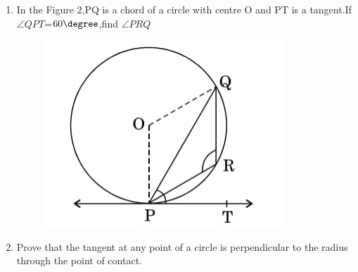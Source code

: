 \begin{enumerate}
 \item In the Figure $2$,PQ is a chord of a circle with centre O and PT is a tangent.If $\angle QPT$=$60\degree$,find $\angle PRQ$
  \begin{figure}[h]
      \centering
      \includegraphics[width=0.6\columnwidth]{figs/cir12.jpg}
  \end{figure}

  \item Prove that the tangent at any point of a circle is perpendicular to the radius through the point of
  contact.


\end{enumerate}
